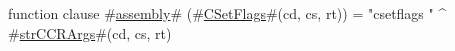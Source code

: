 function clause #\hyperref[sailMIPSzassembly]{assembly}# (#\hyperref[sailMIPSzCSetFlags]{CSetFlags}#(cd, cs, rt)) = "csetflags " ^ #\hyperref[sailMIPSzstrCCRArgs]{strCCRArgs}#(cd, cs, rt)
